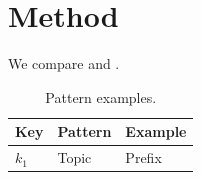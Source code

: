 \documentclass{article}
\begin{document}
\begin{abstract}
Compact smoke fixture for prompt-pattern cleanup.
\end{abstract}

\section{Method}
We compare  and .

\begin{table}
\caption{Pattern examples.}
\begin{tabular}{l|p{2.8cm}|p{}}
Key & Pattern & Example \\
\hline
$k_1$ & Topic & Prefix \\
\end{tabular}
\end{table}
\end{document}
